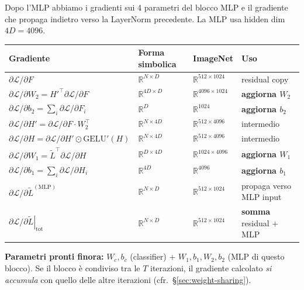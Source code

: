 \documentclass[
  11pt,
]{article}
\begin{document}
\begin{notabox}[title={\textbf{Checkpoint gradienti --- fine MLP backward}}]
Dopo l'MLP abbiamo i gradienti sui 4 parametri del blocco MLP e il gradiente che propaga indietro verso la LayerNorm precedente. La MLP usa hidden dim $4D = 4096$.

\medskip
\begin{center}
{\small
\begin{tabular}{@{}llll@{}}
\toprule
\textbf{Gradiente} & \textbf{Forma simbolica} & \textbf{ImageNet} & \textbf{Uso} \\
\midrule
$\partial\mathcal{L}/\partial F$ & $\mathbb{R}^{N \times D}$ & $\mathbb{R}^{512 \times 1024}$ & residual copy \\
$\partial\mathcal{L}/\partial W_2 = {H'}^\top \partial\mathcal{L}/\partial F$ & $\mathbb{R}^{4D \times D}$ & $\mathbb{R}^{4096 \times 1024}$ & \textbf{aggiorna $W_2$} \\
$\partial\mathcal{L}/\partial b_2 = \sum_i \partial\mathcal{L}/\partial F_i$ & $\mathbb{R}^{D}$ & $\mathbb{R}^{1024}$ & \textbf{aggiorna $b_2$} \\
$\partial\mathcal{L}/\partial H' = \partial\mathcal{L}/\partial F \cdot W_2^\top$ & $\mathbb{R}^{N \times 4D}$ & $\mathbb{R}^{512 \times 4096}$ & intermedio \\
$\partial\mathcal{L}/\partial H = \partial\mathcal{L}/\partial H' \odot \mathrm{GELU}'(H)$ & $\mathbb{R}^{N \times 4D}$ & $\mathbb{R}^{512 \times 4096}$ & intermedio \\
$\partial\mathcal{L}/\partial W_1 = \widetilde{L}^\top \partial\mathcal{L}/\partial H$ & $\mathbb{R}^{D \times 4D}$ & $\mathbb{R}^{1024 \times 4096}$ & \textbf{aggiorna $W_1$} \\
$\partial\mathcal{L}/\partial b_1 = \sum_i \partial\mathcal{L}/\partial H_i$ & $\mathbb{R}^{4D}$ & $\mathbb{R}^{4096}$ & \textbf{aggiorna $b_1$} \\
$\partial\mathcal{L}/\partial \widetilde{L}^{(\text{MLP})}$ & $\mathbb{R}^{N \times D}$ & $\mathbb{R}^{512 \times 1024}$ & propaga verso MLP input \\
\midrule
$\left.\partial\mathcal{L}/\partial \widetilde{L}\right|_{\text{tot}}$ & $\mathbb{R}^{N \times D}$ & $\mathbb{R}^{512 \times 1024}$ & \textbf{somma} residual $+$ MLP \\
\bottomrule
\end{tabular}
}
\end{center}

\medskip
\textbf{Parametri pronti finora:} $W_c, b_c$ (classifier) + $W_1, b_1, W_2, b_2$ (MLP di questo blocco). Se il blocco è condiviso tra le $T$ iterazioni, il gradiente calcolato \emph{si accumula} con quello delle altre iterazioni (cfr.\ \S\ref{sec:weight-sharing}).
\end{notabox}
\end{document}

